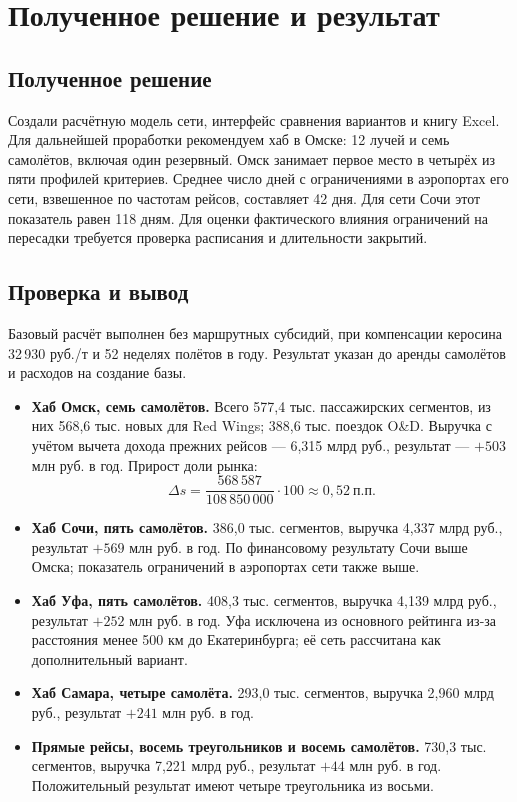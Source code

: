 \documentclass[11pt,a4paper]{article}
\begin{document}
\section{Полученное решение и результат}

\subsection*{Полученное решение}

Создали расчётную модель сети, интерфейс сравнения вариантов
и книгу Excel. Для дальнейшей проработки рекомендуем хаб в Омске:
12 лучей и семь самолётов, включая один резервный.
Омск занимает первое место в четырёх из пяти профилей критериев.
Среднее число дней с ограничениями в аэропортах его сети,
взвешенное по частотам рейсов, составляет 42 дня.
Для сети Сочи этот показатель равен 118 дням.
Для оценки фактического влияния ограничений на пересадки требуется
проверка расписания и длительности закрытий.

\subsection*{Проверка и вывод}

Базовый расчёт выполнен без маршрутных субсидий, при компенсации
керосина 32\,930 руб./т и 52 неделях полётов в году.
Результат указан до аренды самолётов и расходов на создание базы.

\begin{itemize}
    \item \textbf{Хаб Омск, семь самолётов.}
    Всего 577,4 тыс. пассажирских сегментов, из них 568,6 тыс.
    новых для Red Wings; 388,6 тыс. поездок O\&D.
    Выручка с учётом вычета дохода прежних рейсов --- 6,315 млрд руб.,
    результат --- $+503$ млн руб. в год.
    Прирост доли рынка:
    \[
        \Delta s
        =\frac{568\,587}{108\,850\,000}\cdot100
        \approx 0{,}52\ \text{п.п.}
    \]
    \item \textbf{Хаб Сочи, пять самолётов.}
    386,0 тыс. сегментов, выручка 4,337 млрд руб.,
    результат $+569$ млн руб. в год. По финансовому результату
    Сочи выше Омска; показатель ограничений в аэропортах сети также выше.
    \item \textbf{Хаб Уфа, пять самолётов.}
    408,3 тыс. сегментов, выручка 4,139 млрд руб.,
    результат $+252$ млн руб. в год. Уфа исключена из основного
    рейтинга из-за расстояния менее 500 км до Екатеринбурга;
    её сеть рассчитана как дополнительный вариант.
    \item \textbf{Хаб Самара, четыре самолёта.}
    293,0 тыс. сегментов, выручка 2,960 млрд руб.,
    результат $+241$ млн руб. в год.
    \item \textbf{Прямые рейсы, восемь треугольников и восемь самолётов.}
    730,3 тыс. сегментов, выручка 7,221 млрд руб.,
    результат $+44$ млн руб. в год. Положительный результат
    имеют четыре треугольника из восьми.
\end{itemize}
\end{document}

